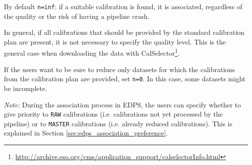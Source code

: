 By default {\tt n=inf}: if a suitable calibration is found, it is associated, regardless of the quality or the risk of having a pipeline crash.

In general, if all calibrations that should be provided by the standard calibration plan are present, it is not necessary to specify the quality level. This is the general case when downloading the data with CalSelector\footnote{\url{http://archive.eso.org/cms/application_support/calselectorInfo.html}}.

If the users want to be sure to reduce only datasets for which the calibrations from the calibration plan are provided, set {\tt n=0}. In this case, some datasets might be incomplete.


{\it Note:} During the association process in EDPS, the users can specify whether to give priority to {\tt RAW} calibrations (i.e. calibrations not yet processed by the pipeline) or to {\tt MASTER} calibrations (i.e. already reduced calibrations). This is explained in Section \ref{sec:edps_association_preference}.
